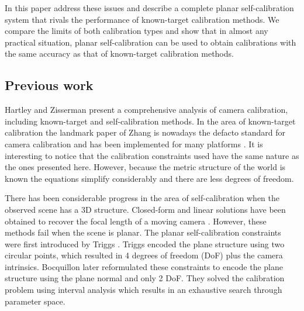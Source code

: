 \documentclass[10pt,twocolumn,letterpaper]{article}
\begin{document}
In this paper address these issues and describe a complete planar self-calibration system that rivals the performance of known-target calibration methods. We compare the limits of both calibration types and show that in almost any practical situation, planar self-calibration can be used to obtain calibrations with the same accuracy as that of known-target calibration methods.


\subsection{Previous work}

Hartley and Zisserman \cite{hartley2003} present a comprehensive analysis of camera calibration, including known-target and self-calibration methods. In the area of known-target calibration the landmark paper of Zhang \cite{zhang1999} is nowadays the defacto standard for camera calibration and has been implemented for many platforms \cite{bouguetMCT,opencv_library}. It is interesting to notice that the calibration constraints used have the same nature as the ones presented here. However, because the metric structure of the world is known the equations simplify considerably and there are less degrees of freedom. 

There has been considerable progress in the area of self-calibration when the observed scene has a 3D structure. Closed-form and linear solutions have been obtained to recover the focal length of a moving camera \cite{bougnoux1998}. However, these methods fail when the scene is planar. The planar self-calibration constraints were first introduced by Triggs \cite{triggs1998}. Triggs encoded the plane structure using two circular points, which resulted in 4 degrees of freedom (DoF) plus the camera intrinsics. Bocquillon \etal \cite{bocquillon2006} later reformulated these constraints to encode the plane structure using the plane normal and only 2 DoF. They solved the calibration problem using interval analysis which results in an exhaustive search through parameter space.
\end{document}
